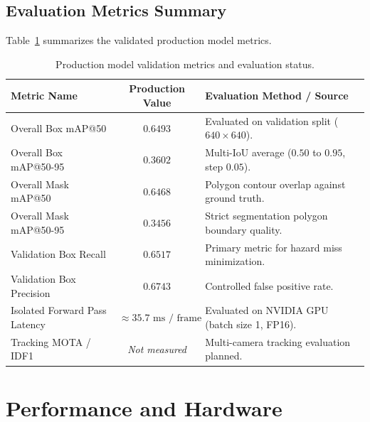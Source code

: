 \documentclass[11pt,a4paper]{article}
\begin{document}
\subsection{Evaluation Metrics Summary}
Table~\ref{tab:evaluation_summary} summarizes the validated production model metrics.

\begin{table}[htbp]
\centering
\small
\caption{Production model validation metrics and evaluation status.}
\label{tab:evaluation_summary}
\begin{tabularx}{\textwidth}{l c X}
\toprule
\textbf{Metric Name} & \textbf{Production Value} & \textbf{Evaluation Method / Source} \\
\midrule
Overall Box mAP@50 & $0.6493$ & Evaluated on validation split ($640\times 640$). \\
Overall Box mAP@50-95 & $0.3602$ & Multi-IoU average ($0.50$ to $0.95$, step $0.05$). \\
Overall Mask mAP@50 & $0.6468$ & Polygon contour overlap against ground truth. \\
Overall Mask mAP@50-95 & $0.3456$ & Strict segmentation polygon boundary quality. \\
Validation Box Recall & $0.6517$ & Primary metric for hazard miss minimization. \\
Validation Box Precision & $0.6743$ & Controlled false positive rate. \\
Isolated Forward Pass Latency & $\approx 35.7\text{ ms / frame}$ & Evaluated on NVIDIA GPU (batch size 1, FP16). \\
Tracking MOTA / IDF1 & \textit{Not measured} & Multi-camera tracking evaluation planned. \\
\bottomrule
\end{tabularx}
\end{table}

\section{Performance and Hardware}
\end{document}
